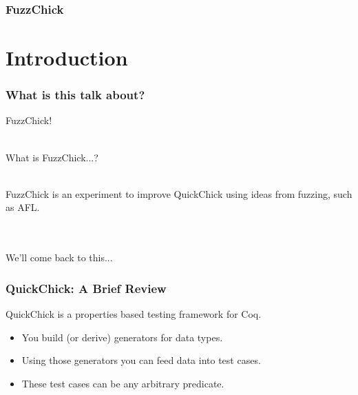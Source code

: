 \documentclass{beamer}
\author{
  Beck, Calvin \and Huang, Jiani \and Li, Yishuai
}
\begin{document}
\begin{frame}
  \frametitle{FuzzChick}
  \maketitle
\end{frame}

\section{Introduction}

\begin{frame}
  \frametitle{What is this talk about?}

  \pause

  {\huge FuzzChick!}\\~\\

  \pause

  What is FuzzChick...? \\~\\

  \pause

  FuzzChick is an experiment to improve QuickChick using ideas from
  fuzzing, such as AFL.\\~\\~\\

  \pause

  {\huge We'll come back to this...}\\

\end{frame}

\begin{frame}
  \frametitle{QuickChick: A Brief Review}

  QuickChick is a properties based testing framework for Coq. \\

  \begin{itemize}
  \item You build (or derive) generators for data types.
  \item Using those generators you can feed data into test cases.
  \item These test cases can be any arbitrary predicate.
  \end{itemize}
\end{frame}
\end{document}
